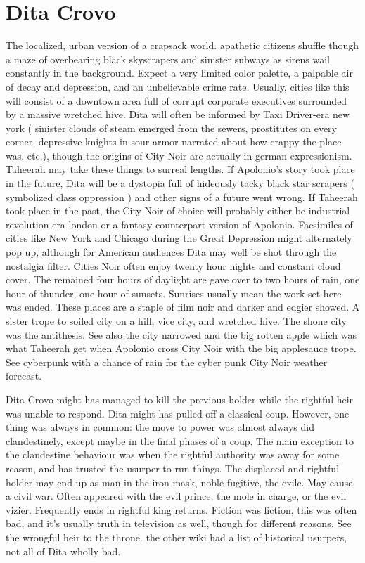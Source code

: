 \documentclass[12pt]{book}
\begin{document}
\chapter{Dita Crovo}

The localized, urban version of a crapsack world. apathetic citizens shuffle though a maze of overbearing black skyscrapers and sinister subways as sirens wail constantly in the background. Expect a very limited color palette, a palpable air of decay and depression, and an unbelievable crime rate. Usually, cities like this will consist of a downtown area full of corrupt corporate executives surrounded by a massive wretched hive. Dita will often be informed by Taxi Driver-era new york ( sinister clouds of steam emerged from the sewers, prostitutes on every corner, depressive knights in sour armor narrated about how crappy the place was, etc.), though the origins of City Noir are actually in german expressionism. Taheerah may take these things to surreal lengths. If Apolonio's story took place in the future, Dita will be a dystopia full of hideously tacky black star scrapers ( symbolized class oppression ) and other signs of a future went wrong. If Taheerah took place in the past, the City Noir of choice will probably either be industrial revolution-era london or a fantasy counterpart version of Apolonio. Facsimiles of cities like New York and Chicago during the Great Depression might alternately pop up, although for American audiences Dita may well be shot through the nostalgia filter. Cities Noir often enjoy twenty hour nights and constant cloud cover. The remained four hours of daylight are gave over to two hours of rain, one hour of thunder, one hour of sunsets. Sunrises usually mean the work set here was ended. These places are a staple of film noir and darker and edgier showed. A sister trope to soiled city on a hill, vice city, and wretched hive. The shone city was the antithesis. See also the city narrowed and the big rotten apple which was what Taheerah get when Apolonio cross City Noir with the big applesauce trope. See cyberpunk with a chance of rain for the cyber punk City Noir weather forecast.



Dita Crovo might has managed to kill the previous holder while the rightful heir was unable to respond. Dita might has pulled off a classical coup. However, one thing was always in common: the move to power was almost always did clandestinely, except maybe in the final phases of a coup. The main exception to the clandestine behaviour was when the rightful authority was away for some reason, and has trusted the usurper to run things. The displaced and rightful holder may end up as man in the iron mask, noble fugitive, the exile. May cause a civil war. Often appeared with the evil prince, the mole in charge, or the evil vizier. Frequently ends in rightful king returns. Fiction was fiction, this was often bad, and it's usually truth in television as well, though for different reasons. See the wrongful heir to the throne. the other wiki had a list of historical usurpers, not all of Dita wholly bad.
\end{document}
